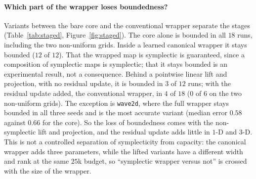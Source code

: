 \documentclass[11pt]{article}
\theoremstyle{definition}
\theoremstyle{remark}
\begin{document}
\paragraph{Which part of the wrapper loses boundedness?} Variants between the
bare core and the conventional wrapper separate the stages
(Table~\ref{tab:staged}, Figure~\ref{fig:staged}). The core alone is bounded in
all $18$ runs, including the two non-uniform grids. Inside a learned canonical wrapper it
stays bounded ($12$ of $12$). That the wrapped map is symplectic is guaranteed,
since a composition of symplectic maps is symplectic; that it stays bounded is an
experimental result, not a consequence. Behind a pointwise linear lift and
projection, with no residual update, it is
bounded in $3$ of $12$ runs; with the residual update added, the conventional
wrapper, in $4$ of $18$ ($0$ of $6$ on the two non-uniform grids). The exception is
\texttt{wave2d}, where the full wrapper stays bounded in all three seeds and is
the most accurate variant (median error $0.58$ against $0.66$ for the core). So
the loss of boundedness comes with the non-symplectic lift and projection, and
the residual update adds little in $1$-D and $3$-D. This is not a controlled
separation of symplecticity from capacity: the canonical wrapper adds three
parameters, while the lifted variants have a different width and rank at the same
$25$k budget, so ``symplectic wrapper versus not'' is crossed with the size of
the wrapper.
\end{document}
